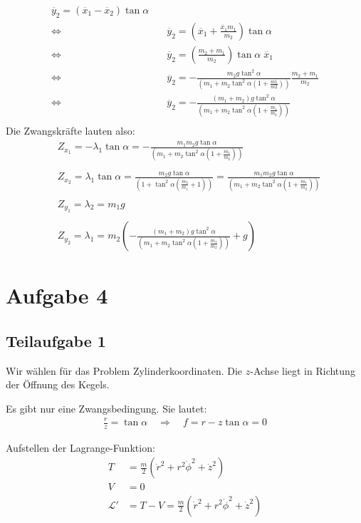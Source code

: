 \documentclass[a4paper,german,12pt,smallheadings]{scrartcl}
\begin{document}
\begin{align*}
\ddot{y_2}=\left(\ddot{x_1}-\ddot{x_2}\right) \tan \alpha\\
\Leftrightarrow & \quad \ddot{y_2}=\left(\ddot{x_1}+\frac{\ddot{x_1}m_1}{m_2}\right) \tan \alpha\\
\Leftrightarrow & \quad \ddot{y_2}=\left(\frac{m_2+m_1}{m_2}\right) \tan \alpha \; \ddot{x_1}\\
\Leftrightarrow & \quad \ddot{y_2}=-\frac{m_2g\tan^2 \alpha}{\left(m_1+m_2\tan^2 \alpha \left(1+\frac{m1}{m2}\right)\right)} \frac{m_2+m_1}{m_2}\\
\Leftrightarrow & \quad \ddot{y_2}=-\frac{\left(m_1+m_2\right)g\tan^2 \alpha}{\left(m_1+m_2\tan^2 \alpha \left(1+\frac{m_1}{m_2}\right)\right)}\\
\end{align*}
Die Zwangskräfte lauten also:
\begin{align*}
& Z_{x_1}=-\lambda_1 \tan \alpha=-\frac{m_1 m_2 g \tan \alpha}{\left(m_1+m_2 \tan^2 \alpha \left(1+\frac{m_1}{m_2}\right)\right)}\\
\\
& Z_{x_2}=\lambda_1 \tan \alpha=\frac{m_2 g \tan \alpha}{\left(1+\tan^2 \alpha \left(\frac{m_2}{m_1}+1\right) \right)}=\frac{m_1 m_2 g \tan \alpha}{\left(m_1+m_2 \tan^2 \alpha \left(1+\frac{m_1}{m_2}\right)\right)}\\
\\
& Z_{y_1}=\lambda_2=m_1g\\
\\
& Z_{y_2}=\lambda_1=m_2\left(-\frac{\left(m_1+m_2\right)g\tan^2 \alpha}{\left(m_1+m_2\tan^2 \alpha \left(1+\frac{m_1}{m_2}\right)\right)}+g\right)
\end{align*}

\section*{Aufgabe 4}
\subsection*{Teilaufgabe 1}
Wir wählen für das Problem Zylinderkoordinaten. Die $z$-Achse liegt in Richtung
der Öffnung des Kegels.

Es gibt nur eine Zwangsbedingung. Sie lautet:
\begin{align*}
\frac{r}{z}=\tan \alpha \quad \Rightarrow \quad f=r-z \tan \alpha =0
\end{align*}

Aufstellen der Lagrange-Funktion:
\begin{align*}
T&=\frac{m}{2} (\dot{r}^2+r^2\dot{\phi}^2+\dot{z}^2) \\
V&=0 \\
\mathcal{L}'&=T-V=\frac{m}{2}(\dot{r}^2+r^2\dot{\phi}^2+\dot{z}^2)
\end{align*}
\end{document}

